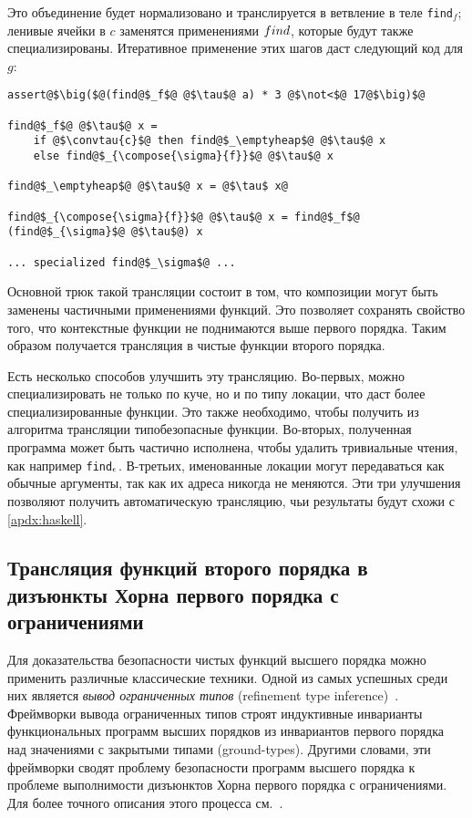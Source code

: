 Это объединение будет нормализовано и транслируется в ветвление в теле \texttt{find}$_f$; ленивые ячейки в $c$ заменятся применениями $find$, которые будут также специализированы. Итеративное применение этих шагов даст следующий код для $g$:
\begin{lstlisting}[basicstyle=\small,escapechar=@]
assert@$\big($@(find@$_f$@ @$\tau$@ a) * 3 @$\not<$@ 17@$\big)$@

find@$_f$@ @$\tau$@ x =
	if @$\convtau{c}$@ then find@$_\emptyheap$@ @$\tau$@ x
	else find@$_{\compose{\sigma}{f}}$@ @$\tau$@ x

find@$_\emptyheap$@ @$\tau$@ x = @$\tau$ x@

find@$_{\compose{\sigma}{f}}$@ @$\tau$@ x = find@$_f$@ (find@$_{\sigma}$@ @$\tau$@) x

... specialized find@$_\sigma$@ ...

\end{lstlisting}

Основной трюк такой трансляции состоит в том, что композиции могут быть заменены частичными применениями функций. Это позволяет сохранять свойство того, что контекстные функции не поднимаются выше первого порядка. Таким образом получается трансляция в чистые функции второго порядка.

\begin{remk*}
Есть несколько способов улучшить эту трансляцию. Во-первых, можно специализировать не только по куче, но и по типу локации, что даст более специализированные функции. Это также необходимо, чтобы получить из алгоритма трансляции типобезопасные функции. Во-вторых, полученная программа может быть частично исполнена, чтобы удалить тривиальные чтения, как например \texttt{find}$_{\epsilon}$. В-третьих, именованные локации могут передаваться как обычные аргументы, так как их адреса никогда не меняются. Эти три улучшения позволяют получить автоматическую трансляцию, чьи результаты будут схожи с \autoref{apdx:haskell}.
\end{remk*}

\subsection{Трансляция функций второго порядка в дизъюнкты Хорна первого порядка с ограничениями}
Для доказательства безопасности чистых функций высшего порядка можно применить различные классические техники. Одной из самых успешных среди них является \emph{вывод ограниченных типов} (refinement type inference)~\cite{vazou2015bounded,unno2013automating,zhu2013compositional,cathcart2017higher}. Фреймворки вывода ограниченных типов строят индуктивные инварианты функциональных программ высших порядков из инвариантов первого порядка над значениями с закрытыми типами (ground-types). Другими словами, эти фреймворки сводят проблему безопасности программ высшего порядка к проблеме выполнимости дизъюнктов Хорна первого порядка с ограничениями. Для более точного описания этого процесса см.~\cite{cathcart2017higher}.

